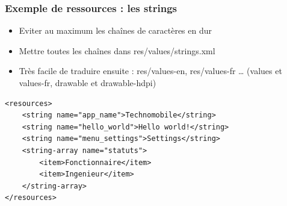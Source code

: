 \documentclass{beamer}
\begin{document}
\begin{frame}[fragile]
\frametitle{Exemple de ressources : les strings}
\begin{itemize}
  \item Eviter au maximum les chaînes de caractères en dur
  \item Mettre toutes les chaînes dans res/values/strings.xml
  \item Très facile de traduire ensuite : res/values-en, res/values-fr \ldots
  (values et values-fr, drawable et drawable-hdpi)
\end{itemize}
\begin{lstlisting}
<resources>
    <string name="app_name">Technomobile</string>
    <string name="hello_world">Hello world!</string>
    <string name="menu_settings">Settings</string>
    <string-array name="statuts">
        <item>Fonctionnaire</item>
        <item>Ingenieur</item>
    </string-array>
</resources>
\end{lstlisting}
\end{frame}
\end{document}
